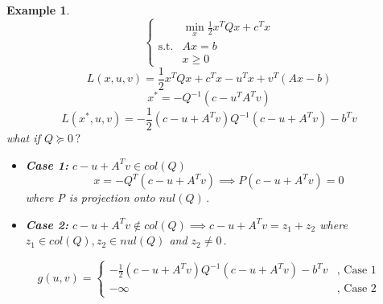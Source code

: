 \documentclass[10pt]{article}
\newtheorem{example}[ex]{Example}
\begin{document}
\begin{example}
	\[
	\left\{
	\begin{array}{lll}
	&\min\limits_{x}\frac{1}{2}x^TQx+c^Tx \\
	\text{s.t.} & Ax=b \\
	& x \geq 0
	\end{array}
	\right.
	\]
	\[L(x, u, v) = \frac{1}{2}x^TQx+c^Tx-u^Tx+v^T(Ax-b)\]
	\[x^* = -Q^{-1}(c-u^TA^Tv)\]
	\[L(x^*,u,v) = -\frac{1}{2}(c-u+A^Tv)Q^{-1}(c-u+A^Tv)-b^Tv\]
	what if $Q \succeq 0\,?$
	\begin{itemize}
		\item \textbf{Case 1:} $c -u + A^Tv \in col(Q)$
		\[x = -Q^T(c-u+A^Tv) \implies P(c-u+A^Tv)=0\] where P is projection onto $nul(Q)\,.$
		\item \textbf{Case 2:} $c-u+A^Tv \not\in col(Q) \implies c-u+A^Tv = z_1 + z_2$ where $z_1 \in col(Q), z_2 \in nul(Q)$ and $z_2 \not= 0\,.$ 
	\end{itemize}
	\[
	g(u, v) = \left\{
	\begin{array}{ll}	
	-\frac{1}{2}(c-u+A^Tv)Q^{-1}(c-u+A^Tv)-b^Tv & \text{, Case 1} \\
	-\infty& \text{, Case 2}
	\end{array}
	\right.
	\]
\end{example}



\end{document}
